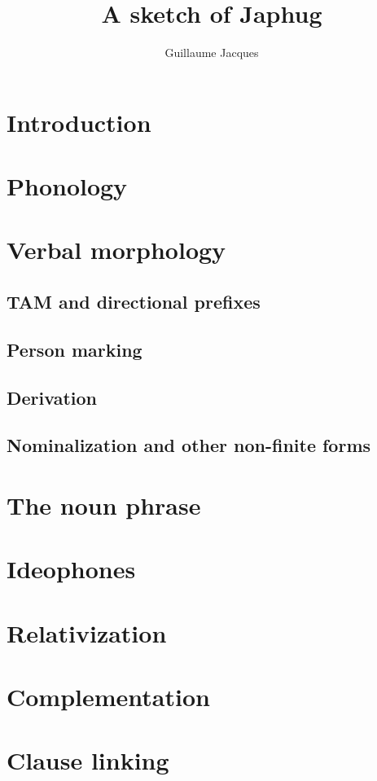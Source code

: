 \documentclass[oldfontcommands,oneside,a4paper,11pt]{article}
\begin{document}
 

\title{A sketch of Japhug}
\author{Guillaume Jacques}
\maketitle

\section{Introduction}

\section{Phonology}

\section{Verbal morphology}


\subsection{TAM and directional prefixes}
\subsection{Person marking}
\subsection{Derivation}
\subsection{Nominalization and other non-finite forms}

\section{The noun phrase}

\section{Ideophones}

\section{Relativization}

\section{Complementation}

\section{Clause linking}

\citet{jacques12demotion}
\citet{jacques14linking}
\citet{jacques14antipassive}
\citet{jacques13harmonization}
\citet{jacques13tropative}
\citet{japhug14ideophones}
\citet{jacques10inverse}
\citet{jacques08}
\citet{jacques07redupl}
\citet{jacques04these}



\end{document}

